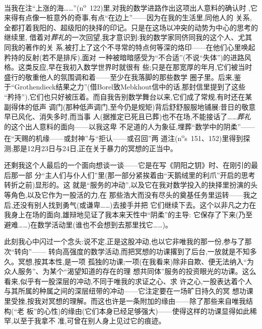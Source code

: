 当我在注“上涨的海……”(n\textsuperscript{o}~122)里,对我的数学进路作出这项出人意料的确认时
,它来得有点像一桩意外的奇事,有点“在边上”——因为在我的生活里,同他人的
关系,全都打着我阳的、超级阳的抉择的印记。只是在这场以冲突的动势为中心的思考的继续里,
借着对\emph{葬礼}的一次回望,我才意识到:我的数学家同侪同我的这个人、尤其同我的著作的关
系,被打上了这个不寻常的特点何等深的烙印——在他们心里唤起矜持的反射(若不是排斥),面对
一种被暗暗感受为“不合适”(不说“失体”)的进路风格。这类反应,早在我初入数学世界时就很有
些;只是在那宽厚的年月,它们被当时盛行的敬重他人的氛围调和着——至少在我落脚的那些数学
圈子里。后来,鉴于“Grothendieck结果之力”(借Borel致Mebkhout信中的话,那封信里提到了这些
“矜持”),它们也只好被压着。而自我告别数学舞台以来,它们成了常规,有时还在某副得体的低声
调门(那种低声调门,至今仍是规矩)背后舒舒服服地铺展:昔日的敬意早已风化、消失多时,而当事
人(据推定已死且已葬)也不在场,不能接话了……\emph{葬礼}的这个出人意料的面向——以我这卑
不足道的人为象征,埋葬“数学中的阴柔”——在“天赐的机缘——或封神”与“拒认——或召回”两
道注(n\textsuperscript{o}s~151、152)里得到探测;那是12月23日与24日,正在关于暴力的冥想的正当中。

\pmark{}还剩我这个人最后的一个面向想谈一谈——它是在写《阴阳之钥》时、在刚引的最后那一部
分“主人们与仆人们”里(那一部分紧挨着由“天鹅绒里的利爪”开启的思考转折之前)显形的。这
就是“服务的冲动”,以及它在我对数学投入的抉择里扮演的头等角色,以及它作为一股活的力,在
那些浩大而没有尽头的奠基任务里运转——我之后,还没有别人找到勇气(或谦卑……)去接手并把
它们继续下去。这个以非凡之力在我身上在场的面向,雄辩地见证了我本来天性中“阴柔”的主导:
它保存了下来(乃至避难……)在数学活动里(谁也不会想到去那里找它……)。

此刻我心中闪过一个念头:说不定,正是这股冲动,也以它非唯我的那一份,参与了那次“转向”——
转向高强度的数学活动,而把冥想的功课撂到了后台,一放就是不知多久。冥想,按其本性,是一项
孤独的功课;一项(在我看来)除非自欺、便无法纳入“为众人服务”、为某个“渴望知道的存在的理
想共同体”服务的投资眼光的功课。这么看来,似乎有一股深层的冲动,不同于唯我的求证之心、求
许之心,一股表达着个人与其所属的种属之间的深层纽带的冲动——它注定要在一场旷日持久的冥
想功课里受挫,按我对冥想的理解。而这也许是一条附加的缘由——除了那些来自唯我结构(“老
板”的心性)的缘由(它们本身已经足够强大)——使得这样的功课显得如此稀罕,以至于我拿不
准,可曾在别人身上见过它的痕迹。

